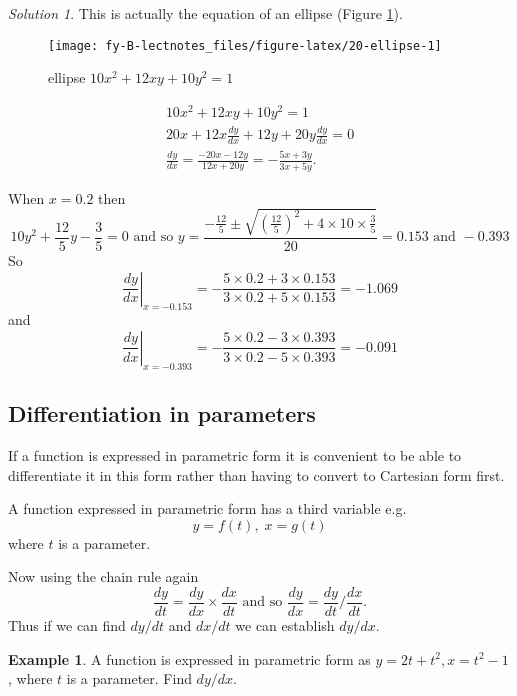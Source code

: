 \documentclass[
  11pt,
  oneside]{book}
\newcommand{\slide}{}
\theoremstyle{definition}
\theoremstyle{definition}
\newtheorem{example}{Example}[chapter]
\theoremstyle{definition}
\theoremstyle{definition}
\theoremstyle{remark}
\newtheorem*{solution}{Solution}
\begin{document}
\begin{solution}
This is actually the equation of an ellipse (Figure \ref{fig:20-ellipse}).

\begin{figure}

{\centering \texttt{[image: fy-B-lectnotes\_files/figure-latex/20-ellipse-1]} 

}

\caption{ellipse $10x^2 + 12xy + 10y^2 = 1$}\label{fig:20-ellipse}
\end{figure}

\begin{gather*}
10x^2 + 12xy + 10y^2 = 1\\
20x+12x\frac{dy}{dx}+12y+20y\frac{dy}{dx}=0\\
\frac{dy}{dx} = \frac{-20x-12y}{12x+20y} = -\frac{5x+3y}{3x+5y}.
\end{gather*}

When \(x=0.2\) then
\[
10y^2+\frac{12}5y-\frac35=0\text{ and so }y = \frac{-\frac{12}5\pm\sqrt{\left(\frac{12}5\right)^2+4\times10\times\frac35}}{20} = 0.153\text{ and }-0.393
\]
So
\[
\left.\frac{dy}{dx}\right|_{x=-0.153} = -\frac{5\times0.2+3\times 0.153}{3\times0.2+5\times0.153} = -1.069
\]
and
\[
\left.\frac{dy}{dx}\right|_{x=-0.393} = -\frac{5\times0.2-3\times 0.393}{3\times0.2-5\times0.393} = -0.091
\]
\end{solution}

\slide

\subsection{Differentiation in parameters}\label{differentiation-in-parameters}

If a function is expressed in parametric form it is convenient to be able to differentiate it in this form rather than having to convert to Cartesian form first.

A function expressed in parametric form has a third variable e.g.
\[
y = f(t),\; x = g(t)
\]
where \(t\) is a parameter.

Now using the chain rule again
\[
\frac{dy}{dt} = \frac{dy}{dx}\times\frac{dx}{dt}\text{ and so }\frac{dy}{dx} = \frac{dy}{dt}/\frac{dx}{dt}.
\]
Thus if we can find \(dy/dt\) and \(dx/dt\) we can establish \(dy/dx\).

\slide

\begin{example}
A function is expressed in parametric form as \(y = 2t + t^2, x = t^2 - 1\), where \(t\) is a parameter. Find \(dy/dx\).
\end{example}
\end{document}
